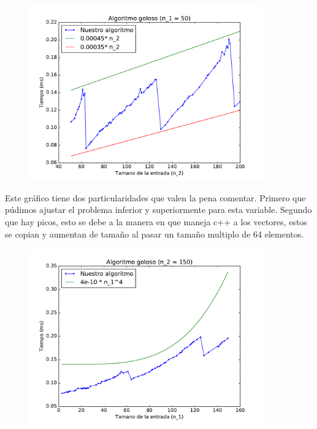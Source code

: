 \begin{figure}[H]
 \centering
	\includegraphics[width=0.9\textwidth]{graficos/problema_4/tiempos_2.pdf}
	\caption{}
	\label{fig:problema4-2}
\end{figure}

Este gráfico tiene dos particularidades que valen la pena comentar. Primero que púdimos ajustar el problema inferior y superiormente para esta variable. Segundo que hay picos, esto se debe a la manera en que maneja c++ a los vectores, estos se copian y aumentan de tamaño al pasar un tamaño multiplo de 64 elementos.

\begin{figure}[H]
 \centering
	\includegraphics[width=0.9\textwidth]{graficos/problema_4/tiempos_3.pdf}
	\caption{}
	\label{fig:problema4-3}
\end{figure}

